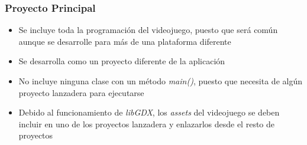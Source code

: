 \documentclass[xcolor={dvipsnames}]{beamer}
\begin{document}
\begin{frame}\frametitle{Proyecto Principal}
	\begin{itemize}
		\item Se incluye toda la programación del videojuego, puesto que será común aunque se desarrolle para más de una plataforma diferente
		\item Se desarrolla como un proyecto diferente de la aplicación
		\item No incluye ninguna clase con un método \emph{main()}, puesto que necesita de algún proyecto lanzadera para ejecutarse
		\item Debido al funcionamiento de \emph{\textcolor{resalta}{libGDX}}, los \emph{assets} del videojuego se deben incluir en uno de los proyectos lanzadera y enlazarlos desde el resto de proyectos
	\end{itemize}
\end{frame}
\end{document}

